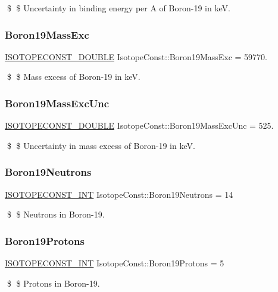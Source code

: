 \$ \$ Uncertainty in binding energy per A of Boron-\/19 in keV. \mbox{\label{group___isotope_const-_boron-_b19_ga54442a88c59c3af6faaa1c56295a3d31}} 
\subsubsection{\texorpdfstring{Boron19\+Mass\+Exc}{Boron19MassExc}}
{\footnotesize\ttfamily \mbox{\hyperlink{group___isotope_const-_macros_ga8f45a7272ce02c0b4c65c44636ed719a}{I\+S\+O\+T\+O\+P\+E\+C\+O\+N\+S\+T\+\_\+\+D\+O\+U\+B\+LE}} Isotope\+Const\+::\+Boron19\+Mass\+Exc = 59770.}

\$ \$ Mass excess of Boron-\/19 in keV. \mbox{\label{group___isotope_const-_boron-_b19_ga0c374caa0fafb74e074aa2a99d7b4e07}} 
\subsubsection{\texorpdfstring{Boron19\+Mass\+Exc\+Unc}{Boron19MassExcUnc}}
{\footnotesize\ttfamily \mbox{\hyperlink{group___isotope_const-_macros_ga8f45a7272ce02c0b4c65c44636ed719a}{I\+S\+O\+T\+O\+P\+E\+C\+O\+N\+S\+T\+\_\+\+D\+O\+U\+B\+LE}} Isotope\+Const\+::\+Boron19\+Mass\+Exc\+Unc = 525.}

\$ \$ Uncertainty in mass excess of Boron-\/19 in keV. \mbox{\label{group___isotope_const-_boron-_b19_gaeaf6429da9c01dfa299c1cb140fec7c6}} 
\subsubsection{\texorpdfstring{Boron19\+Neutrons}{Boron19Neutrons}}
{\footnotesize\ttfamily \mbox{\hyperlink{group___isotope_const-_macros_ga5f18360b3e99483a35c32d789e62621c}{I\+S\+O\+T\+O\+P\+E\+C\+O\+N\+S\+T\+\_\+\+I\+NT}} Isotope\+Const\+::\+Boron19\+Neutrons = 14}

\$ \$ Neutrons in Boron-\/19. \mbox{\label{group___isotope_const-_boron-_b19_gadcb62419ae22a01945d42eb51a449401}} 
\subsubsection{\texorpdfstring{Boron19\+Protons}{Boron19Protons}}
{\footnotesize\ttfamily \mbox{\hyperlink{group___isotope_const-_macros_ga5f18360b3e99483a35c32d789e62621c}{I\+S\+O\+T\+O\+P\+E\+C\+O\+N\+S\+T\+\_\+\+I\+NT}} Isotope\+Const\+::\+Boron19\+Protons = 5}

\$ \$ Protons in Boron-\/19. 
